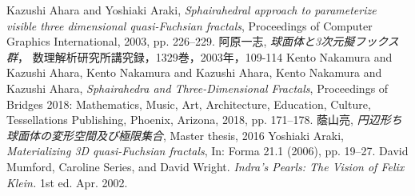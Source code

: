 \documentclass[dvipdfmx]{interact}
\theoremstyle{plain}%
\theoremstyle{definition}
\theoremstyle{remark}
\theoremstyle{problemstyle}
\begin{document}
\begin{thebibliography}{99}
        Kazushi Ahara and Yoshiaki Araki,
        \emph{Sphairahedral approach to parameterize visible three
        dimensional quasi-Fuchsian fractals},
        Proceedings of Computer Graphics International, 2003,
        pp. 226--229.
        阿原一志, \emph{球面体と3次元擬フックス群}，
        数理解析研究所講究録，1329巻，2003年，109-114
        Kento Nakamura and Kazushi Ahara,
        Kento Nakamura and Kazushi Ahara,
        Kento Nakamura and Kazushi Ahara,
        \emph{Sphairahedra and Three-Dimensional Fractals}, 
        Proceedings of Bridges 2018: Mathematics, Music, Art, Architecture,
        Education, Culture, Tessellations Publishing,
        Phoenix, Arizona, 2018, pp. 171--178.
        蔭山亮, 
        \emph{円辺形ち球面体の変形空間及び極限集合},
        Master thesis, 2016
        Yoshiaki Araki,
        \emph{Materializing 3D quasi-Fuchsian fractals},
        In: Forma 21.1 (2006), pp. 19–27.
        David Mumford, Caroline Series, and David Wright.
        \emph{Indra’s Pearls: The Vision of Felix Klein.}
        1st ed. Apr. 2002.
\end{thebibliography}
\end{document}

